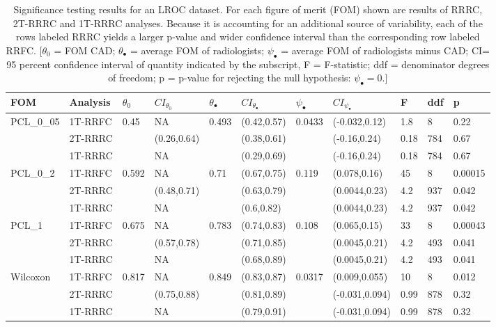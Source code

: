 \documentclass[
]{book}
\begin{document}
\begin{table}

\caption{\label{tab:standalone-cad-table2}Significance testing results for an LROC dataset. For each figure of merit (FOM) shown are results of RRRC, 2T-RRRC and 1T-RRRC analyses. Because it is accounting for an additional source of variability, each of the rows labeled RRRC yields a larger p-value and wider confidence interval than the corresponding row labeled RRFC. [$\theta_0$ = FOM CAD; $\theta_{\bullet}$ = average FOM of radiologists; $\psi_{\bullet}$ = average FOM of radiologists minus CAD; CI= 95 percent confidence interval of quantity indicated by the subscript, F = F-statistic; ddf = denominator degrees of freedom; p = p-value for rejecting the null hypothesis: $\psi_{\bullet} = 0$.]}
\centering
\fontsize{10}{12}\selectfont
\begin{tabular}[t]{lllllllllll}
\toprule
FOM & Analysis & $\theta_0$ & $CI_{\theta_0}$ & $\theta_{\bullet}$ & $CI_{\theta_{\bullet}}$ & $\psi_{\bullet}$ & $CI_{\psi_{\bullet}}$ & F & ddf & p\\
\midrule
PCL\_0\_05 & 1T-RRFC & 0.45 & NA & 0.493 & (0.42,0.57) & 0.0433 & (-0.032,0.12) & 1.8 & 8 & 0.22\\
 & 2T-RRRC &  & (0.26,0.64) &  & (0.38,0.61) &  & (-0.16,0.24) & 0.18 & 784 & 0.67\\
 & 1T-RRRC &  & NA &  & (0.29,0.69) &  & (-0.16,0.24) & 0.18 & 784 & 0.67\\
PCL\_0\_2 & 1T-RRFC & 0.592 & NA & 0.71 & (0.67,0.75) & 0.119 & (0.078,0.16) & 45 & 8 & 0.00015\\
 & 2T-RRRC &  & (0.48,0.71) &  & (0.63,0.79) &  & (0.0044,0.23) & 4.2 & 937 & 0.042\\
\addlinespace
 & 1T-RRRC &  & NA &  & (0.6,0.82) &  & (0.0044,0.23) & 4.2 & 937 & 0.042\\
PCL\_1 & 1T-RRFC & 0.675 & NA & 0.783 & (0.74,0.83) & 0.108 & (0.065,0.15) & 33 & 8 & 0.00043\\
 & 2T-RRRC &  & (0.57,0.78) &  & (0.71,0.85) &  & (0.0045,0.21) & 4.2 & 493 & 0.041\\
 & 1T-RRRC &  & NA &  & (0.68,0.89) &  & (0.0045,0.21) & 4.2 & 493 & 0.041\\
Wilcoxon & 1T-RRFC & 0.817 & NA & 0.849 & (0.83,0.87) & 0.0317 & (0.009,0.055) & 10 & 8 & 0.012\\
\addlinespace
 & 2T-RRRC &  & (0.75,0.88) &  & (0.81,0.89) &  & (-0.031,0.094) & 0.99 & 878 & 0.32\\
 & 1T-RRRC &  & NA &  & (0.79,0.91) &  & (-0.031,0.094) & 0.99 & 878 & 0.32\\
\bottomrule
\end{tabular}
\end{table}
\end{document}
